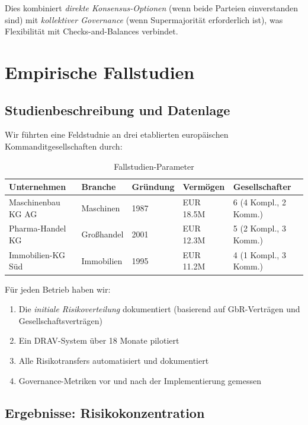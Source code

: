 \documentclass[a4paper,12pt]{article}
\theoremstyle{definition}
\begin{document}
Dies kombiniert \emph{direkte Konsensus-Optionen} (wenn beide Parteien einverstanden sind) mit \emph{kollektiver Governance} (wenn Supermajorität erforderlich ist), was Flexibilität mit Checks-and-Balances verbindet.

\section{Empirische Fallstudien}

\subsection{Studienbeschreibung und Datenlage}

Wir führten eine Feldstudnie an drei etablierten europäischen Kommanditgesellschaften durch:

\begin{table}[H]
\centering
\caption{Fallstudien-Parameter}
\label{tab:fallstudien}
\begin{tabular}{@{}lllll@{}}
\toprule
\textbf{Unternehmen} & \textbf{Branche} & \textbf{Gründung} & \textbf{Vermögen} & \textbf{Gesellschafter} \\
\midrule
Maschinenbau KG AG & Maschinen & 1987 & EUR 18.5M & 6 (4 Kompl., 2 Komm.) \\
Pharma-Handel KG & Großhandel & 2001 & EUR 12.3M & 5 (2 Kompl., 3 Komm.) \\
Immobilien-KG Süd & Immobilien & 1995 & EUR 11.2M & 4 (1 Kompl., 3 Komm.) \\
\bottomrule
\end{tabular}
\end{table}

Für jeden Betrieb haben wir:
\begin{enumerate}
    \item Die \emph{initiale Risikoverteilung} dokumentiert (basierend auf GbR-Verträgen und Gesellschaftsverträgen)
    \item Ein DRAV-System über 18 Monate pilotiert
    \item Alle Risikotransfers automatisiert und dokumentiert
    \item Governance-Metriken vor und nach der Implementierung gemessen
\end{enumerate}

\subsection{Ergebnisse: Risikokonzentration}
\end{document}
